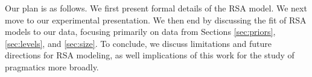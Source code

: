 Our plan is as follows. We first present formal details of the RSA model. We next move to our experimental presentation. We then end by discussing the fit of RSA models to our data, focusing primarily on data from Sections \ref{sec:priors}, \ref{sec:levels}, and \ref{sec:size}. To conclude, we discuss limitations and future directions for RSA modeling, as well implications of this work for the study of pragmatics more broadly. 


